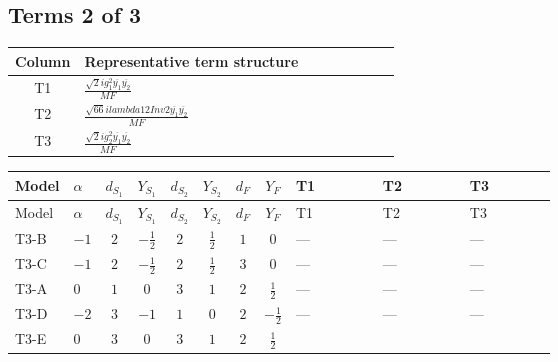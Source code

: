 \documentclass[8pt]{article}
\begin{document}
\begin{landscape}
\subsection*{Terms 2 of 3}
\begin{center}
\begin{tabular}{@{}c >{\raggedright\arraybackslash}p{0.82\linewidth}@{}}
\toprule
Column & Representative term structure \\
\midrule
T1 & \(\displaystyle \frac{\sqrt{2} i g_{1}^{2} \overline{y_{1}} \overline{y_{2}}}{MF}\) \\
\midrule
T2 & \(\displaystyle \frac{\sqrt{66} i lambda12Inv2 \overline{y_{1}} \overline{y_{2}}}{MF}\) \\
\midrule
T3 & \(\displaystyle \frac{\sqrt{2} i g_{2}^{2} \overline{y_{1}} \overline{y_{2}}}{MF}\) \\
\midrule
\bottomrule
\end{tabular}
\end{center}
\smallskip
\tiny
\begin{longtable}{@{}llcccccc >{\raggedright\arraybackslash}p{0.21\linewidth} >{\raggedright\arraybackslash}p{0.21\linewidth} >{\raggedright\arraybackslash}p{0.21\linewidth}@{}}
\toprule
Model & $\alpha$ & $d_{S_1}$ & $Y_{S_1}$ & $d_{S_2}$ & $Y_{S_2}$ & $d_F$ & $Y_F$ & T1 & T2 & T3 \\
\midrule
\endfirsthead
\toprule
Model & $\alpha$ & $d_{S_1}$ & $Y_{S_1}$ & $d_{S_2}$ & $Y_{S_2}$ & $d_F$ & $Y_F$ & T1 & T2 & T3 \\
\midrule
\endhead
T3-B & $-1$ & $2$ & $-\frac{1}{2}$ & $2$ & $\frac{1}{2}$ & $1$ & $0$ & --- & --- & --- \\
\midrule
T3-C & $-1$ & $2$ & $-\frac{1}{2}$ & $2$ & $\frac{1}{2}$ & $3$ & $0$ & --- & --- & --- \\
\midrule
T3-A & $0$ & $1$ & $0$ & $3$ & $1$ & $2$ & $\frac{1}{2}$ & --- & --- & --- \\
\midrule
T3-D & $-2$ & $3$ & $-1$ & $1$ & $0$ & $2$ & $-\frac{1}{2}$ & --- & --- & --- \\
\midrule
T3-E & $0$ & $3$ & $0$ & $3$ & $1$ & $2$ & $\frac{1}{2}$ & \scriptsize\adjustbox{max width=\linewidth}{$\begin{gathered} \frac{3 \sqrt{2} i g_{1}^{2} \overline{y_{1}} \overline{y_{2}}}{16 MF}\end{gathered}$} & \scriptsize\adjustbox{max width=\linewidth}{$\begin{gathered} \frac{3 \sqrt{66} i lambda12Inv2 \overline{y_{1}} \overline{y_{2}}}{44 MF}\end{gathered}$} & \scriptsize\adjustbox{max width=\linewidth}{$\begin{gathered} \frac{45 \sqrt{2} i g_{2}^{2} \overline{y_{1}} \overline{y_{2}}}{16 MF}\end{gathered}$} \\
\midrule
\bottomrule
\end{longtable}
\clearpage

\end{landscape}
\end{document}
